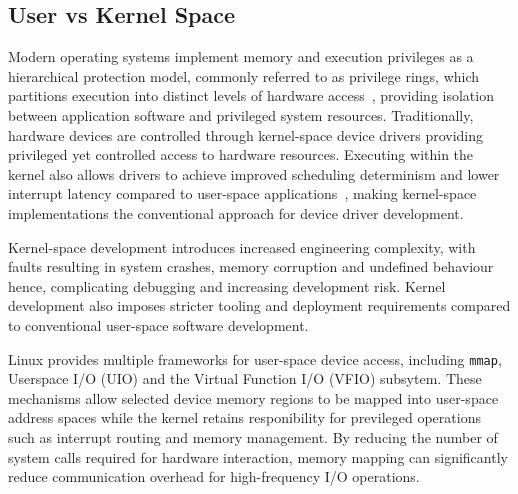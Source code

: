 \documentclass[final]{cmpreport}
\begin{document}
\subsection{User vs Kernel Space}
Modern operating systems implement memory and execution privileges as a hierarchical protection model, commonly referred to as privilege rings, which partitions execution into distinct levels of hardware access~\cite{tanenbaumModernOperatingSystems2015}, providing isolation between application software and privileged system resources. Traditionally, hardware devices are controlled through kernel-space device drivers providing privileged yet controlled access to hardware resources. Executing within the kernel also allows drivers to achieve improved scheduling determinism and lower interrupt latency compared to user-space applications~\cite{minghaoPerformanceAnalysisOptimization2007}, making kernel-space implementations the conventional approach for device driver development.

Kernel-space development introduces increased engineering complexity, with faults resulting in system crashes, memory corruption and undefined behaviour hence, complicating debugging and increasing development risk. Kernel development also imposes stricter tooling and deployment requirements compared to conventional user-space software development. 

Linux provides multiple frameworks for user-space device access, including \texttt{mmap}, Userspace I/O (UIO) and the Virtual Function I/O (VFIO) subsytem. These mechanisms allow selected device memory regions to be mapped into user-space address spaces while the kernel retains responibility for previleged operations such as interrupt routing and memory management. By reducing the number of system calls required for hardware interaction, memory mapping can significantly reduce communication overhead for high-frequency I/O operations.
\end{document}

